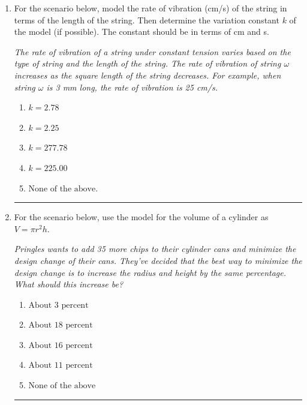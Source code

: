 \documentclass[14pt]{extbook}
\newcommand{\litem}[1]{\item#1\hspace*{-1cm}\rule{\textwidth}{0.4pt}}
\begin{document}
\begin{enumerate}
{\begin{enumerate}[label=\Alph*.]
\end{enumerate} }
\litem{
For the scenario below, model the rate of vibration (cm/s) of the string in terms of the length of the string. Then determine the variation constant $k$ of the model (if possible). The constant should be in terms of cm and s.
\begin{center}
    \textit{ The rate of vibration of a string under constant tension varies based on the type of string and the length of the string. The rate of vibration of string $\omega$ increases as the square length of the string decreases. For example, when string $\omega$ is 3 mm long, the rate of vibration is 25 cm/s. }
\end{center}
\begin{enumerate}[label=\Alph*.]
\item \( k = 2.78 \)
\item \( k = 2.25 \)
\item \( k = 277.78 \)
\item \( k = 225.00 \)
\item \( \text{None of the above.} \)

\end{enumerate} }
\litem{
For the scenario below, use the model for the volume of a cylinder as $V = \pi r^2 h$.
\begin{center}
    \textit{ Pringles wants to add 35 \text{percent} more chips to their cylinder cans and minimize the design change of their cans. They've decided that the best way to minimize the design change is to increase the radius and height by the same percentage. What should this increase be? }
\end{center}
\begin{enumerate}[label=\Alph*.]
\item \( \text{About } 3 \text{ percent} \)
\item \( \text{About } 18 \text{ percent} \)
\item \( \text{About } 16 \text{ percent} \)
\item \( \text{About } 11 \text{ percent} \)
\item \( \text{None of the above} \)


\end{enumerate}}
\end{enumerate}
\end{document}

